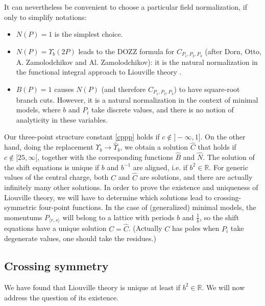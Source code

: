 \documentclass[12pt, a4paper]{article}
\theoremstyle{break}
\begin{document}
It can nevertheless be convenient to choose a particular field normalization, if only to simplify notations:
\begin{itemize}
 \item $N(P)=1$ is the simplest choice.
 \item $N(P)=\Upsilon_b(2P)$ leads to the DOZZ formula for $C_{P_1,P_2,P_3}$ (after Dorn, Otto, A.
Zamolodchikov and Al. Zamolodchikov): it is the natural normalization in the functional integral approach to Liouville theory \cite{zz95}.
\item $B(P)=1$ causes $N(P)$ (and therefore $C_{P_1,P_2,P_3}$) to have square-root branch cuts. However, it is a natural normalization in the context of minimal models, where $b$ and $P_i$ take discrete values, and there is no notion of analyticity in these variables.
\end{itemize}

Our three-point structure constant \eqref{cppp} holds if
$c\notin ]-\infty, 1]$. 
On the other hand, doing the replacement $\Upsilon_b\to \hat\Upsilon_b$, we obtain a solution $\hat C$ that holds if  $c\notin [25,\infty[$, together with the corresponding functions $\hat B$ and $\hat N$.
The solution of the shift equations is unique if $b$ and $b^{-1}$ are aligned, i.e. if $b^2\in\mathbb{R}$. For generic values of the central charge, both $C$ and $\hat C$ are solutions, and there are actually infinitely many other solutions. In order to prove the existence and uniqueness of Liouville theory, we will have to determine which solutions lead to crossing-symmetric four-point functions.
In the case of (generalized) minimal models, the momentums $P_{\langle r,s\rangle}$ will belong to a lattice with periods $b$ and $\frac{1}{b}$, so the shift equations have a unique solution $C=\hat{C}$. (Actually $C$ has poles when $P_i$ take degenerate values, one should take the residues.)


\subsection{Crossing symmetry}\label{sec:cs}

We have found that Liouville theory is unique at least if $b^2\in\mathbb{R}$. We will now address the question of its existence. 
\end{document}
